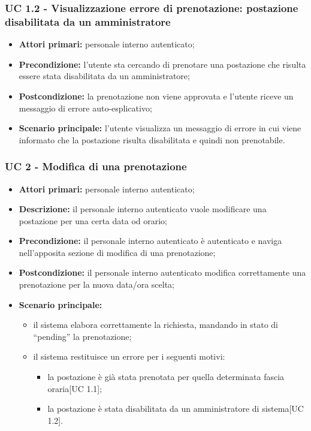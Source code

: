 \subsubsection{UC 1.2 - Visualizzazione errore di prenotazione: postazione disabilitata da un amministratore}
\begin{itemize}
\item \textbf{Attori primari:} personale interno autenticato;
\item \textbf{Precondizione:} l'utente sta cercando di prenotare una postazione che risulta essere stata disabilitata da un amministratore;
\item \textbf{Postcondizione:} la prenotazione non viene approvata e l'utente riceve un messaggio di errore auto-esplicativo;
\item \textbf{Scenario principale:} l'utente visualizza un messaggio di errore in cui viene informato che la postazione risulta disabilitata e quindi non prenotabile.
\end{itemize}


\subsubsection{UC 2 - Modifica di una prenotazione}

\begin{itemize}
\item \textbf{Attori primari:} personale interno autenticato;
\item \textbf{Descrizione:} il personale interno autenticato vuole modificare una postazione per una certa data od orario;
\item \textbf{Precondizione:} il personale interno autenticato è autenticato e naviga nell’apposita sezione di modifica di una prenotazione;
\item \textbf{Postcondizione:} il personale interno autenticato modifica correttamente una prenotazione per la nuova data/ora scelta;
\item \textbf{Scenario principale:} 
	\begin{itemize}
		\item il sistema elabora correttamente la richiesta, mandando in stato di “pending” la prenotazione;
		\item il sistema restituisce un errore per i seguenti motivi:
		\begin{itemize}
			\item la postazione è già stata prenotata per quella determinata fascia oraria[UC 1.1];
			\item la postazione è stata disabilitata da un amministratore di sistema[UC 1.2].	
		\end{itemize}
	\end{itemize}
\end{itemize}

